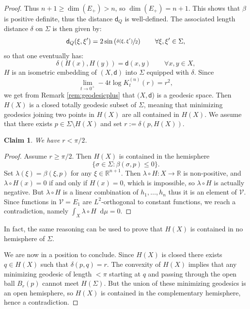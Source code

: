 \documentclass[10pt]{amsart}
\let\backslash\setminus
\theoremstyle{plain}
\newtheorem{claim}[theorem]{Claim}
\theoremstyle{definition}
\newcommand{\setR}{\mathbb{R}}
\newcommand{\cV}{\mathcal{V}}
\newcommand{\di}{\mathop{}\!\mathrm{d}}
\newcommand{\dist}{\mathsf{d}}
\begin{document}
\begin{proof}
Thus $n+1 \ge \dim(E_+)> n$, so $\dim(E_+)=n+1$. This shows that $\beta$ is positive definite, thus the distance $\dist_Q$ is well-defined. The associated length distance $\delta$ on $\Sigma$ is then given by:
\[
\dist_Q(\xi,\xi') = 2 \sin\left(\sfrac{\delta(\xi,\xi')}{2} \right) \qquad \forall \xi, \xi' \in \Sigma,
\]
so that one eventually has:
\[
\delta(H(x),H(y)) = \dist(x,y) \qquad \forall x,y \in X,
\]
\ie $H$ is an isometric embedding of $(X,\dist)$ into $\Sigma$ equipped with $\delta$.
Since
\[
\lim_{t\to 0^+} -4t \log K_t^{(n)}(r)=r^2,
\]
we get from Remark \ref{rem:geodesicplus} that
$(X,\dist$) is a geodesic space. Then $H(X)$ is a closed totally geodesic subset of $\Sigma$, meaning that minimizing geodesics joining two points in $H(X)$ are all contained in $H(X)$. We assume that there exists $p \in \Sigma \backslash H(X)$ and set $r:=\delta(p,H(X))$.

\begin{claim}
We have $r< \pi/2$.
\end{claim}

\begin{proof}
Assume $r\ge \pi/2$. Then $H(X)$ is contained in the hemisphere
\[
\{\sigma \in \Sigma: \beta(\sigma,p)\le 0\}.
\]
Set $\lambda(\xi)=\beta(\xi,p)$ for any $\xi \in \setR^{n+1}$. Then $\lambda \circ H:X\to\setR$ is non-positive, and $\lambda \circ H(x)=0$ if and only if $H(x)=0$, which is impossible, so $\lambda \circ H$ is actually negative. But $\lambda \circ H$ is a linear combination of $h_1,\ldots,h_n$ thus it is an element of $\cV$. Since functions in $\cV = E_1$ are $L^2$-orthogonal to constant functions, we reach a contradiction, namely $\int_X \lambda \circ H \di \mu = 0$.
\end{proof}

In fact, the same reasoning can be used to prove that $H(X)$ is contained in no hemisphere of $\Sigma$.

We are now in a position to conclude. Since $H(X)$ is closed there exists $q\in H(X)$ such that $\delta(p,q)=r$. The convexity of $H(X)$ implies that any minimizing geodesic of length $<\pi$ starting at $q$ and passing through the open ball $B_r(p)$ cannot meet $H(\Sigma)$. But the union of these minimizing geodesics is an open hemisphere, so $H(X)$ is contained in the complementary hemisphere, hence a contradiction.
\end{proof}
\end{document}
